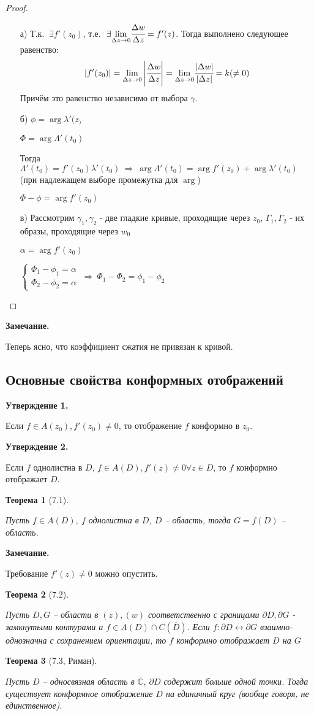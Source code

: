 \documentclass[draft]{report}
\newcommand{\forcenewline}{$\phantom{\mbox{newline}}$}
\newcommand{\dd}{\partial}
\newcommand{\then}{\ \Rightarrow\ }
\renewcommand{\C}{\mathbb{C}}
\newcommand{\mlim}[1]{\underset{#1}{\lim}}
\renewcommand{\bar}{\overline}
\renewcommand{\a}{\alpha}
\newcommand{\g}{\gamma}
\renewcommand{\f}{\phi}
\renewcommand{\l}{\lambda}
\newcommand{\D}{\Delta}
\newcommand{\E}{\ \exists}
\newcommand{\CC}{\bar{\C}}
\newcommand{\sys}[1]{\left\{\begin{matrix}#1\end{matrix}\right.}
\newtheorem*{theor}{Теорема}
\theoremstyle{remark}
\begin{document}
\begin{proof}
\forcenewline
\begin{enumerate}
\item[а)] Т.к. $\E f'(z_0)$, т.е. $\E \mlim{\D z\to0}\cfrac{\D w}{\D z}=f'(z)$. Тогда выполнено следующее равенство:
$$|f'(z_0)|=\mlim{\D z\to0}\left|\cfrac{\D w}{\D z}\right|=\mlim{\D z\to0}\cfrac{|\D w|}{|\D z|}=k(\neq0)$$
Причём это равенство независимо от выбора $\g$.
\item[б)] $\f=\arg \l'(z_)$

$\Phi=\arg\Lambda'(t_0)$

Тогда $\Lambda'(t_0)=f'(z_0)\l'(t_0)\then\arg\Lambda'(t_0)=\arg f'(z_0)+\arg\l'(t_0)$ (при надлежащем выборе промежутка для $\arg$)

$\Phi-\f=\arg f'(z_0)$
\item[в)] Рассмотрим $\g_1,\g_2$ - две гладкие кривые, проходящие через $z_0$, $\Gamma_1,\Gamma_2$ - их образы, проходящие через $w_0$

$\a=\arg f'(z_0)$

$\sys{\Phi_1-\f_1=\a \\ \Phi_2-\f_2=\a } \then \Phi_1-\Phi_2=\f_1-\f_2$
\end{enumerate}
\end{proof}

{\bfseries Замечание.}

Теперь ясно, что коэффициент сжатия не привязан к кривой.

\subsection{Основные свойства конформных отображений}

{\bfseries Утверждение 1.}

Если $f\in A(z_0), f'(z_0)\neq 0$, то отображение $f$ конформно в $z_0$.

{\bfseries Утверждение 2.}

Если $f$ однолистна в $D$, $f\in A(D), f'(z)\neq0 \forall z\in D$, то $f$ конформно отображает $D$.

\begin{theor}[7.1]
\forcenewline

Пусть $f\in A(D),\ f$ однолистна в $D$, $D$ -- область, тогда $G=f(D)$ -- область.
\end{theor}
{\bfseries Замечание.}

Требование $f'(z)\neq0$ можно опустить.
\begin{theor}[7.2]
\forcenewline

Пусть $D,G$ -- области в $(z), (w)$ соответственно с границами $\dd D, \dd G$ - замкнутыми контурами и $f\in A(D)\cap C(\bar{D})$. Если $f\colon \dd D\leftrightarrow \dd G$ взаимно-однозначна с сохранением ориентации, то $f$ конформно отображает $D$ на $G$
\end{theor}
\begin{theor}[7.3, Риман]
\forcenewline

Пусть $D$ -- односвязная область в $\CC$, $\dd D$ содержит больше одной точки. Тогда существует конформное отображение $D$ на единичный круг (вообще говоря, не единственное).
\end{theor}
\end{document}

